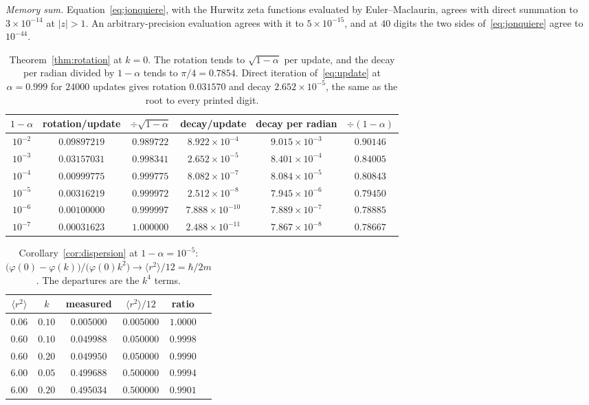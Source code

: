 \documentclass[11pt]{amsart}
\theoremstyle{definition}
\theoremstyle{remark}
\begin{document}
\emph{Memory sum.} Equation~\eqref{eq:jonquiere}, with the Hurwitz zeta functions evaluated by Euler--Maclaurin, agrees with direct summation to $3\times10^{-14}$ at $\lvert z\rvert>1$. An arbitrary-precision evaluation agrees with it to $5\times10^{-15}$, and at $40$ digits the two sides of~\eqref{eq:jonquiere} agree to $10^{-44}$.

\begin{table}[h]
\centering\small
\begin{tabular}{cccccc}
\toprule
$1-\alpha$ & rotation/update & $\div\sqrt{1-\alpha}$ & decay/update & decay per radian & $\div(1-\alpha)$\\
\midrule
$10^{-2}$ & $0.09897219$ & $0.989722$ & $8.922\times10^{-4}$ & $9.015\times10^{-3}$ & $0.90146$\\
$10^{-3}$ & $0.03157031$ & $0.998341$ & $2.652\times10^{-5}$ & $8.401\times10^{-4}$ & $0.84005$\\
$10^{-4}$ & $0.00999775$ & $0.999775$ & $8.082\times10^{-7}$ & $8.084\times10^{-5}$ & $0.80843$\\
$10^{-5}$ & $0.00316219$ & $0.999972$ & $2.512\times10^{-8}$ & $7.945\times10^{-6}$ & $0.79450$\\
$10^{-6}$ & $0.00100000$ & $0.999997$ & $7.888\times10^{-10}$ & $7.889\times10^{-7}$ & $0.78885$\\
$10^{-7}$ & $0.00031623$ & $1.000000$ & $2.488\times10^{-11}$ & $7.867\times10^{-8}$ & $0.78667$\\
\bottomrule
\end{tabular}
\caption{Theorem~\ref{thm:rotation} at $k=0$. The rotation tends to $\sqrt{1-\alpha}$ per update, and the decay per radian divided by $1-\alpha$ tends to $\pi/4=0.7854$. Direct iteration of~\eqref{eq:update} at $\alpha=0.999$ for $24000$ updates gives rotation $0.031570$ and decay $2.652\times10^{-5}$, the same as the root to every printed digit.}
\label{tab:modes}
\end{table}

\begin{table}[h]
\centering\small
\begin{tabular}{cccccc}
\toprule
$\langle r^2\rangle$ & $k$ & measured & $\langle r^2\rangle/12$ & ratio\\
\midrule
$0.06$ & $0.10$ & $0.005000$ & $0.005000$ & $1.0000$\\
$0.60$ & $0.10$ & $0.049988$ & $0.050000$ & $0.9998$\\
$0.60$ & $0.20$ & $0.049950$ & $0.050000$ & $0.9990$\\
$6.00$ & $0.05$ & $0.499688$ & $0.500000$ & $0.9994$\\
$6.00$ & $0.20$ & $0.495034$ & $0.500000$ & $0.9901$\\
\bottomrule
\end{tabular}
\caption{Corollary~\ref{cor:dispersion} at $1-\alpha=10^{-5}$: $\big(\varphi(0)-\varphi(k)\big)/\big(\varphi(0)k^2\big)\to\langle r^2\rangle/12=\hbar/2m$. The departures are the $k^4$ terms.}
\label{tab:mass}
\end{table}
\end{document}
